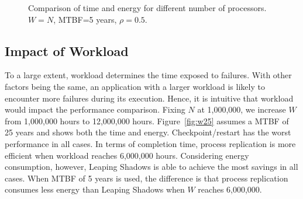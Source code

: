 \begin{figure}[!h]
	\begin{center}
	\end{center}
	\caption{Comparison of time and energy for different number of processors. $W=N$, MTBF=5 years, $\rho=0.5$.}
	\label{fig:n5}
\end{figure}


\subsection{Impact of Workload}
\label{eval_workload}
To a large extent, workload determines the time exposed to failures. With other factors being the same, an application with a larger workload is likely to encounter more failures during its execution. Hence, it is intuitive that workload would impact the performance comparison. 
Fixing $N$ at 1,000,000, we increase $W$ from 1,000,000 hours to 12,000,000 hours. Figure~\ref{fig:w25} assumes a MTBF of 25 years and shows both the time and energy. Checkpoint/restart has the worst performance in all cases. In terms of completion time, process replication is more efficient when workload reaches 6,000,000 hours. Considering energy consumption, however, Leaping Shadows is able to achieve the most savings in all cases. When MTBF of 5 years is used, the difference is that process replication consumes less energy than Leaping Shadows when $W$ reaches 6,000,000.

